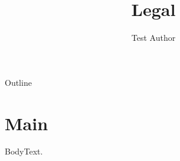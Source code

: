 \documentclass[aspectratio=169,10pt]{beamer}
\title{Legal}
\author{Test Author}
\begin{document}
\maketitle
\begin{frame}[toc]{Outline}
	\tableofcontents
\end{frame}
\section{Main}
\begin{frame}{Body}Text.\end{frame}
\end{document}
